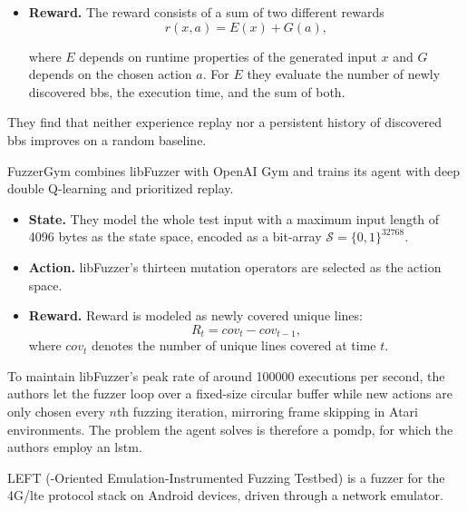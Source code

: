 \begin{description}[style=nextline, leftmargin=0pt, labelindent=0pt, labelwidth=0pt]
\begin{itemize}
      \item \textbf{Reward.}
        The reward consists of a sum of two different rewards
        \[
          r(x, a) = E(x) + G(a),
        \]

        where $E$ depends on runtime properties of the generated input $x$ and $G$
        depends on the chosen action $a$. For $E$ they evaluate the number of
        newly discovered \glspl{bb}, the execution time, and the sum of both.
    \end{itemize}
    They find that neither experience replay nor a persistent history of discovered \glspl{bb}
    improves on a random baseline.

  \item[Drozd and Wagner (2018)~\cite{drozd_fuzzergym_2018}]
    FuzzerGym combines libFuzzer with OpenAI Gym and trains its agent with deep double
    Q-learning and prioritized replay.

    \begin{itemize}
      \item \textbf{State.}
        They model the whole test input with a maximum input length of
        \num{4096} bytes as the state space, encoded as a bit-array
        $\mathcal{S}=\{0,1\}^{32768}$.

      \item \textbf{Action.}
        libFuzzer's thirteen mutation operators are selected as the action space.

      \item \textbf{Reward.}
        Reward is modeled as newly covered unique lines:
        \[
          R_t = \mathit{cov}_t - \mathit{cov}_{t-1},
        \]
        where $\mathit{cov}_t$ denotes the number of unique lines covered at time $t$.

    \end{itemize}
    To maintain libFuzzer's peak rate of around \num{100000} executions per
    second, the authors let the fuzzer loop over a fixed-size circular buffer
    while new actions are only chosen every $n$th fuzzing iteration, mirroring frame
    skipping in Atari environments.
    The problem the agent solves is therefore a \gls{pomdp}, for which the authors
    employ an \gls{lstm}.

  \item[Fang and Yan (2018)~\cite{lopez_emulation-instrumented_2018}]
    LEFT (-Oriented Emulation-Instrumented Fuzzing Testbed) is a fuzzer for the
    4G/\gls{lte} protocol stack on Android devices, driven through a network emulator.


\end{description}
